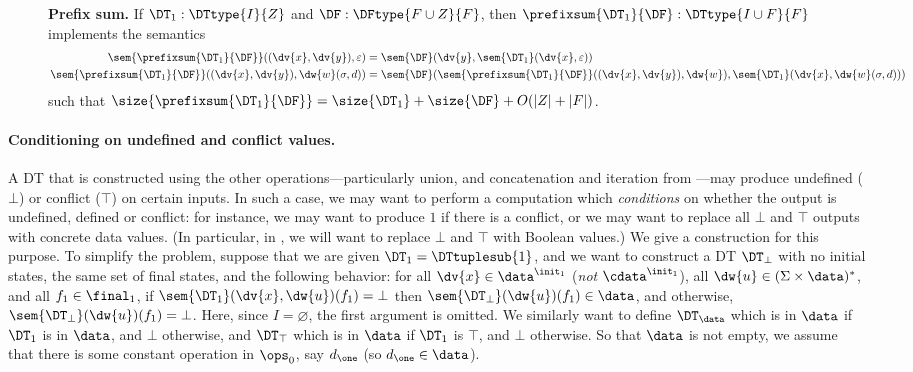\begin{figure}[H]
\begin{dtbox}
\textbf{Prefix sum.}
If $\DT_1: \DTtype{I}{Z}$
and $\DF: \DFtype{F \cup Z}{F}$,
then $\prefixsum{\DT_1}{\DF}: \DTtype{I \cup F}{F}$
implements the semantics
\begin{align*}
\sem{\prefixsum{\DT_1}{\DF}}((\dv{x},\dv{y}),\varepsilon)
    &= \sem{\DF}(\dv{y},\sem{\DT_1}(\dv{x},\varepsilon)) \\
\sem{\prefixsum{\DT_1}{\DF}}((\dv{x},\dv{y}),\dw{w} (\sigma,d))
    &= \sem{\DF}(\sem{\prefixsum{\DT_1}{\DF}}((\dv{x},\dv{y}),\dw{w}),\sem{\DT_1}(\dv{x},\dw{w} (\sigma,d)))
\end{align*}
such that $\size{\prefixsum{\DT_1}{\DF}} = \size{\DT_1} + \size{\DF} + O(|Z| + |F|)$.
\end{dtbox}

\label{dt:fig:prefix-sum}
\end{figure}

\paragraph*{Conditioning on undefined and conflict values.}
A DT that is constructed using the other operations---particularly union, and concatenation and iteration from ---may produce undefined ($\bot$) or conflict ($\top$) on certain inputs. In such a case, we may want to perform a computation which \emph{conditions} on whether the output is undefined, defined or conflict: for instance, we may want to produce $1$ if there is a conflict, or we may want to replace all $\bot$ and $\top$ outputs with concrete data values. (In particular, in , we will want to replace $\bot$ and $\top$ with Boolean values.) We give a construction for this purpose. To simplify the problem, suppose that we are given $\DT_1 = \DTtuplesub{1}$, and we want to construct a DT $\DT_\bot$ with no initial states, the same set of final states, and the following behavior: for all $\dv{x} \in \data^{\init_1}$ (\emph{not} $\cdata^{\init_1}$), all $\dw{u} \in (\Sigma \times \data)^{*}$, and all $f_1 \in \final_1$, if $\sem{\DT_1}(\dv{x},\dw{u})(f_1) = \bot$ then $\sem{\DT_\bot}(\dw{u})(f_1) \in \data$, and otherwise, $\sem{\DT_\bot}(\dw{u})(f_1) = \bot$. Here, since $I = \varnothing$, the first argument is omitted. We similarly want to define $\DT_\data$ which is in $\data$ if $\DT_1$ is in $\data$, and $\bot$ otherwise, and $\DT_\top$ which is in $\data$ if $\DT_1$ is $\top$, and $\bot$ otherwise.
So that $\data$ is not empty, we assume that there is some constant operation in $\ops_0$, say $d_\one$ (so $d_\one \in \data$).

